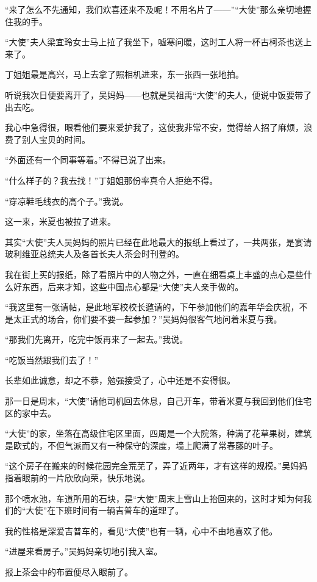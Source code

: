 \par “来了怎么不先通知，我们欢喜还来不及呢！不用名片了——”“大使”那么亲切地握住我的手。
\par “大使”夫人梁宜玲女士马上拉了我坐下，嘘寒问暖，这时工人将一杯古柯茶也送上来了。
\par 丁姐姐最是高兴，马上去拿了照相机进来，东一张西一张地拍。
\par 听说我次日便要离开了，吴妈妈——也就是吴祖禹“大使”的夫人，便说中饭要带了出去吃。
\par 我心中急得很，眼看他们要来爱护我了，这使我非常不安，觉得给人招了麻烦，浪费了别人宝贝的时间。
\par “外面还有一个同事等着。”不得已说了出来。
\par “什么样子的？我去找！”丁姐姐那份率真令人拒绝不得。
\par “穿凉鞋毛线衣的高个子。”我说。
\par 这一来，米夏也被拉了进来。
\par 其实“大使”夫人吴妈妈的照片已经在此地最大的报纸上看过了，一共两张，是宴请玻利维亚总统夫人及各首长夫人茶会时刊登的。
\par 我在街上买的报纸，除了看照片中的人物之外，一直在细看桌上丰盛的点心是些什么好东西，后来才知，这些中国点心都是“大使”夫人亲手做的。
\par “我这里有一张请帖，是此地军校校长邀请的，下午参加他们的嘉年华会庆祝，不是太正式的场合，你们要不要一起参加？”吴妈妈很客气地问着米夏与我。
\par “那我们先离开，吃完中饭再来了一起去。”我说。
\par “吃饭当然跟我们去了！”
\par 长辈如此诚意，却之不恭，勉强接受了，心中还是不安得很。
\par 那一日是周末，“大使”请他司机回去休息，自己开车，带着米夏与我回到他们住宅区的家中去。
\par “大使”的家，坐落在高级住宅区里面，四周是一个大院落，种满了花草果树，建筑是欧式的，不但气派而又有一种保守的深度，墙上爬满了常春藤的叶子。
\par “这个房子在搬来的时候花园完全荒芜了，弄了近两年，才有这样的规模。”吴妈妈指着眼前的一片欣欣向荣，快乐地说。
\par 那个喷水池，车道所用的石块，是“大使”周末上雪山上抬回来的，这时才知为何我们的“大使”在下班时间有一辆吉普车的道理了。
\par 我的性格是深爱吉普车的，看见“大使”也有一辆，心中不由地喜欢了他。
\par “进屋来看房子。”吴妈妈亲切地引我入室。
\par 报上茶会中的布置便尽入眼前了。
